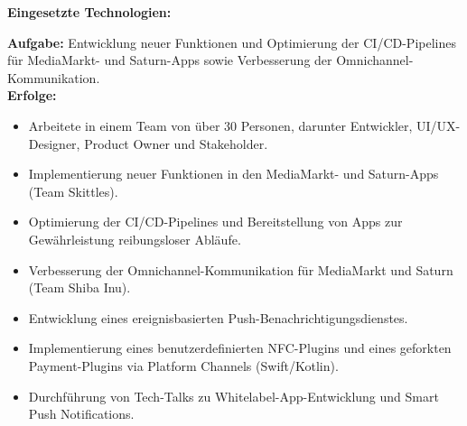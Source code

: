 \documentclass[10pt,a4paper,normalphoto]{altacv}
\begin{document}
\begin{fullwidth}
\textbf{Eingesetzte Technologien:}\\[0.4em]

\vspace{2em}

\textbf{Aufgabe:} Entwicklung neuer Funktionen und Optimierung der CI/CD-Pipelines für MediaMarkt- und Saturn-Apps sowie Verbesserung der Omnichannel-Kommunikation.\\
\textbf{Erfolge:}
\begin{itemize}
    \item Arbeitete in einem Team von über 30 Personen, darunter Entwickler, UI/UX-Designer, Product Owner und Stakeholder.
    \item Implementierung neuer Funktionen in den MediaMarkt- und Saturn-Apps (Team Skittles).
    \item Optimierung der CI/CD-Pipelines und Bereitstellung von Apps zur Gewährleistung reibungsloser Abläufe.
    \item Verbesserung der Omnichannel-Kommunikation für MediaMarkt und Saturn (Team Shiba Inu).
    \item Entwicklung eines ereignisbasierten Push-Benachrichtigungsdienstes.
    \item Implementierung eines benutzerdefinierten NFC-Plugins und eines geforkten Payment-Plugins via Platform Channels (Swift/Kotlin).
    \item Durchführung von Tech-Talks zu Whitelabel-App-Entwicklung und Smart Push Notifications.
\end{itemize}


\end{fullwidth}
\end{document}
